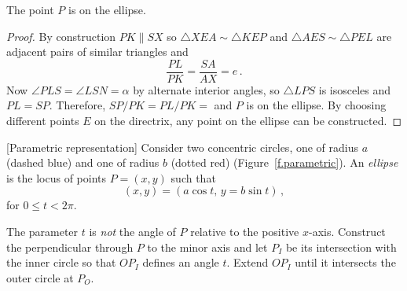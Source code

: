 \begin{theorem}\label{thm.point-on-an-ellipse}
The point $P$ is on the ellipse.
\end{theorem}
\begin{proof}
By construction $PK\parallel SX$ so $\triangle XEA\sim \triangle KEP$ and $\triangle AES\sim \triangle PEL$ are adjacent pairs of similar triangles and
\[
\frac{PL}{PK}=\frac{SA}{AX}=e\,.
\]
Now $\angle PLS = \angle LSN=\alpha$ by alternate interior angles, so $\triangle LPS$ is isosceles and $PL=SP$. Therefore, $SP/PK=PL/PK=$ and $P$ is on the ellipse. By choosing different points $E$ on the directrix, any point on the ellipse can be constructed.\hqed
\end{proof}

\begin{definition}\label{def.parametric}[Parametric representation]
Consider two concentric circles, one of radius $a$ (dashed blue) and one of radius $b$ (dotted red) (Figure~\ref{f.parametric}). An \emph{ellipse} is the locus of points $P=(x,y)$ such that
\[
(x,y)= (a\cos t,\, y = b \sin t)\,,
\]
for $0\le t < 2\pi$.
\end{definition}
The parameter $t$ is \emph{not} the angle of $P$ relative to the positive $x$-axis. Construct the perpendicular through $P$ to the minor axis and let $P_I$ be its intersection with the inner circle so that $OP_I$ defines an angle $t$.  Extend $OP_I$ until it intersects the outer circle at $P_O$. 


